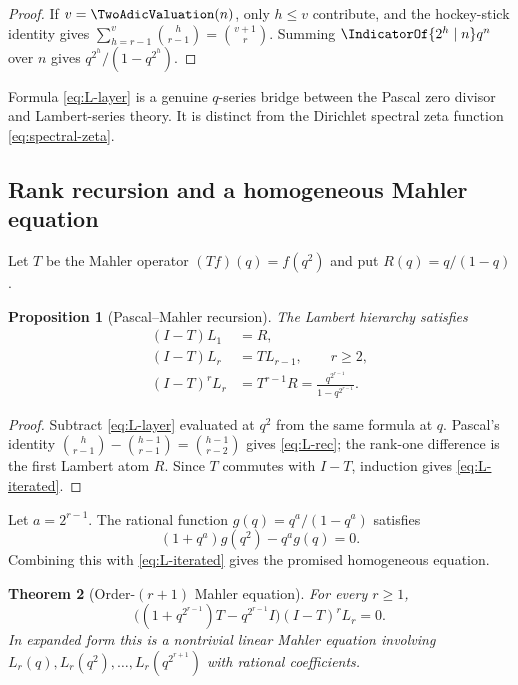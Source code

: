 \documentclass[11pt,oneside]{article}
\newtheorem{theorem}{Theorem}[section]
\newtheorem{proposition}[theorem]{Proposition}
\theoremstyle{definition}
\theoremstyle{remark}
\begin{document}
\begin{proof}
If $v=\TwoAdicValuation(n)$, only $h\leq v$ contribute, and the hockey-stick identity
gives
$\sum_{h=r-1}^{v}\binom h{r-1}=\binom{v+1}{r}$.  Summing
$\IndicatorOf{2^h\mid n}q^n$ over $n$ gives $q^{2^h}/(1-q^{2^h})$.
\end{proof}

Formula \eqref{eq:L-layer} is a genuine $q$-series bridge between the
Pascal zero divisor and Lambert-series theory.  It is distinct from the
Dirichlet spectral zeta function \eqref{eq:spectral-zeta}.

\subsection{Rank recursion and a homogeneous Mahler equation}

Let $T$ be the Mahler operator $(Tf)(q)=f(q^2)$ and put
$R(q)=q/(1-q)$.

\begin{proposition}[Pascal--Mahler recursion]\label{prop:L-recursion}
The Lambert hierarchy satisfies
\begin{align}
 (I-T)L_1&=R,\label{eq:L-r1}\\
 (I-T)L_r&=TL_{r-1},\qquad r\geq2,\label{eq:L-rec}\\
 (I-T)^rL_r&=T^{r-1}R
 =\frac{q^{2^{r-1}}}{1-q^{2^{r-1}}}.\label{eq:L-iterated}
\end{align}
\end{proposition}

\begin{proof}
Subtract \eqref{eq:L-layer} evaluated at $q^2$ from the same formula at $q$.
Pascal's identity
$\binom h{r-1}-\binom{h-1}{r-1}=\binom{h-1}{r-2}$ gives
\eqref{eq:L-rec}; the rank-one difference is the first Lambert atom $R$.
Since $T$ commutes with $I-T$, induction gives \eqref{eq:L-iterated}.
\end{proof}

Let $a=2^{r-1}$.  The rational function
$g(q)=q^a/(1-q^a)$ satisfies
\[
 (1+q^a)g(q^2)-q^ag(q)=0.
\]
Combining this with \eqref{eq:L-iterated} gives the promised homogeneous
equation.

\begin{theorem}[Order-$(r+1)$ Mahler equation]\label{thm:L-Mahler}
For every $r\geq1$,
\begin{equation}\label{eq:L-homogeneous}
 \boxed{
 \bigl((1+q^{2^{r-1}})T-q^{2^{r-1}}I\bigr)
 (I-T)^rL_r=0.}
\end{equation}
In expanded form this is a nontrivial linear Mahler equation involving
$L_r(q),L_r(q^2),\ldots,L_r(q^{2^{r+1}})$ with rational coefficients.
\end{theorem}
\end{document}
